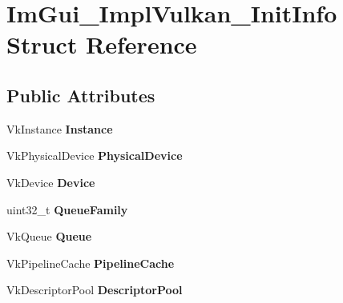 \hypertarget{structImGui__ImplVulkan__InitInfo}{}\section{Im\+Gui\+\_\+\+Impl\+Vulkan\+\_\+\+Init\+Info Struct Reference}
\label{structImGui__ImplVulkan__InitInfo}
\subsection*{Public Attributes}
\begin{DoxyCompactItemize}
\item 
\mbox{\label{structImGui__ImplVulkan__InitInfo_a7b876fe4c1aa7d3e974eeb1292973a7c}} 
Vk\+Instance {\bfseries Instance}
\item 
\mbox{\label{structImGui__ImplVulkan__InitInfo_a443ec478eaf433968dea82f35d2c4ddb}} 
Vk\+Physical\+Device {\bfseries Physical\+Device}
\item 
\mbox{\label{structImGui__ImplVulkan__InitInfo_a9afcaa962b5f6ca11181588ae439af78}} 
Vk\+Device {\bfseries Device}
\item 
\mbox{\label{structImGui__ImplVulkan__InitInfo_a51c934190a99b91180bf95ce56a36407}} 
uint32\+\_\+t {\bfseries Queue\+Family}
\item 
\mbox{\label{structImGui__ImplVulkan__InitInfo_a43144f43d4eeb25a5230a55a1cea2bd4}} 
Vk\+Queue {\bfseries Queue}
\item 
\mbox{\label{structImGui__ImplVulkan__InitInfo_af1235f630cab2ce5bb29129391870065}} 
Vk\+Pipeline\+Cache {\bfseries Pipeline\+Cache}
\item 
\mbox{\label{structImGui__ImplVulkan__InitInfo_a8062aeaef73fcda522fbb866b312320a}} 
Vk\+Descriptor\+Pool {\bfseries Descriptor\+Pool}
\item 
\mbox{\label{structImGui__ImplVulkan__InitInfo_afd70c96b923e8af179013387e896b1b7}} 

\end{DoxyCompactItemize}
